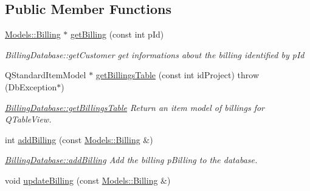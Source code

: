 \subsection*{Public Member Functions}
\begin{DoxyCompactItemize}
\item 
\hyperlink{classModels_1_1Billing}{Models\+::\+Billing} $\ast$ \hyperlink{classDatabase_1_1BillingDatabase_a3063746cff15d93c4f5f319d53381579}{get\+Billing} (const int p\+Id)
\begin{DoxyCompactList}\small\item\em Billing\+Database\+::get\+Customer get informations about the billing identified by {\itshape p\+Id} \end{DoxyCompactList}\item 
Q\+Standard\+Item\+Model $\ast$ \hyperlink{classDatabase_1_1BillingDatabase_a3d3aec676ed5f7862197cac63adb18e9}{get\+Billings\+Table} (const int id\+Project)  throw (\+Db\+Exception$\ast$)
\begin{DoxyCompactList}\small\item\em \hyperlink{classDatabase_1_1BillingDatabase_a3d3aec676ed5f7862197cac63adb18e9}{Billing\+Database\+::get\+Billings\+Table} Return an item model of billings for Q\+Table\+View. \end{DoxyCompactList}\item 
int \hyperlink{classDatabase_1_1BillingDatabase_aa08b3b4917eb6c447ef513e5aafff38f}{add\+Billing} (const \hyperlink{classModels_1_1Billing}{Models\+::\+Billing} \&)
\begin{DoxyCompactList}\small\item\em \hyperlink{classDatabase_1_1BillingDatabase_aa08b3b4917eb6c447ef513e5aafff38f}{Billing\+Database\+::add\+Billing} Add the billing {\itshape p\+Billing} to the database. \end{DoxyCompactList}\item 
\hypertarget{classDatabase_1_1BillingDatabase_a59830561e9573ab3ce463e9dc1b68a0c}{void \hyperlink{classDatabase_1_1BillingDatabase_a59830561e9573ab3ce463e9dc1b68a0c}{update\+Billing} (const \hyperlink{classModels_1_1Billing}{Models\+::\+Billing} \&)}\label{classDatabase_1_1BillingDatabase_a59830561e9573ab3ce463e9dc1b68a0c}


\end{DoxyCompactItemize}
